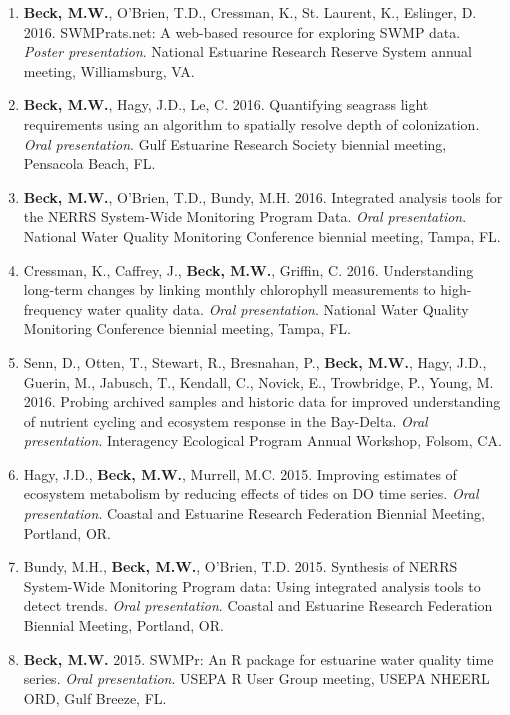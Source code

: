 \documentclass[letterpaper,12pt]{article}
\begin{document}
\begin{enumerate}
\item {\bf Beck, M.W.}, O'Brien, T.D., Cressman, K., St. Laurent, K., Eslinger, D. 2016. SWMPrats.net: A web-based resource for exploring SWMP data. \textit{Poster presentation}. National Estuarine Research Reserve System annual meeting, Williamsburg, VA. 

\item {\bf Beck, M.W.}, Hagy, J.D., Le, C. 2016. Quantifying seagrass light requirements using an algorithm to spatially resolve depth of colonization. \textit{Oral presentation}. Gulf Estuarine Research Society biennial meeting, Pensacola Beach, FL.

\item {\bf Beck, M.W.}, O'Brien, T.D., Bundy, M.H. 2016. Integrated analysis tools for the NERRS System-Wide Monitoring Program Data. \textit{Oral presentation}. National Water Quality Monitoring Conference biennial meeting, Tampa, FL.

\item Cressman, K., Caffrey, J., {\bf Beck, M.W.}, Griffin, C. 2016. Understanding long-term changes by linking monthly chlorophyll measurements to high-frequency water quality data. \textit{Oral presentation}. National Water Quality Monitoring Conference biennial meeting, Tampa, FL.

\item Senn, D., Otten, T., Stewart, R., Bresnahan, P., {\bf Beck, M.W.}, Hagy, J.D., Guerin, M., Jabusch, T., Kendall, C., Novick, E., Trowbridge, P., Young, M. 2016. Probing archived samples and historic data for improved understanding of nutrient cycling and ecosystem response in the Bay-Delta. \textit{Oral presentation}. Interagency Ecological Program Annual Workshop, Folsom, CA.

\item Hagy, J.D., {\bf Beck, M.W.}, Murrell, M.C. 2015. Improving estimates of ecosystem metabolism by reducing effects of tides on DO time series. \textit{Oral presentation}. Coastal and Estuarine Research Federation Biennial Meeting, Portland, OR. 

\item Bundy, M.H., {\bf Beck, M.W.}, O'Brien, T.D. 2015. Synthesis of NERRS System-Wide Monitoring Program data: Using integrated analysis tools to detect trends. \textit{Oral presentation}. Coastal and Estuarine Research Federation Biennial Meeting, Portland, OR.

\item {\bf Beck, M.W.} 2015. SWMPr: An R package for estuarine water quality time series. \textit{Oral presentation}. USEPA R User Group meeting, USEPA NHEERL ORD, Gulf Breeze, FL.


\end{enumerate}
\end{document}
